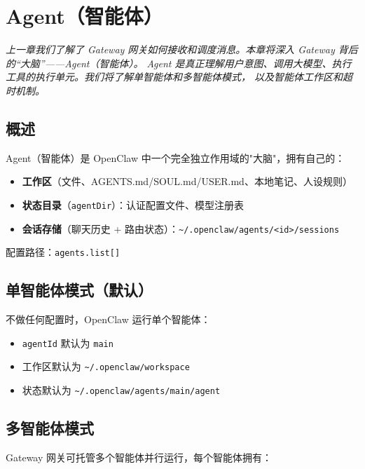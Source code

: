 \chapter{Agent（智能体）}

\vspace{0.5em}
\noindent\textit{上一章我们了解了 Gateway 网关如何接收和调度消息。本章将深入 Gateway 背后的“大脑”——Agent（智能体）。
Agent 是真正理解用户意图、调用大模型、执行工具的执行单元。我们将了解单智能体和多智能体模式，
以及智能体工作区和超时机制。}
\vspace{0.5em}

\section{概述}

Agent（智能体）是 OpenClaw 中一个完全独立作用域的"大脑"，拥有自己的：

\begin{itemize}
  \item \textbf{工作区}（文件、AGENTS.md/SOUL.md/USER.md、本地笔记、人设规则）
  \item \textbf{状态目录}（\texttt{agentDir}）：认证配置文件、模型注册表
  \item \textbf{会话存储}（聊天历史 + 路由状态）：\texttt{\textasciitilde{}/.openclaw/agents/<id>/sessions}
\end{itemize}

配置路径：\texttt{agents.list[]}

\section{单智能体模式（默认）}

不做任何配置时，OpenClaw 运行单个智能体：

\begin{itemize}
  \item \texttt{agentId} 默认为 \texttt{main}
  \item 工作区默认为 \texttt{\textasciitilde{}/.openclaw/workspace}
  \item 状态默认为 \texttt{\textasciitilde{}/.openclaw/agents/main/agent}
\end{itemize}

\section{多智能体模式}

Gateway 网关可托管多个智能体并行运行，每个智能体拥有：

